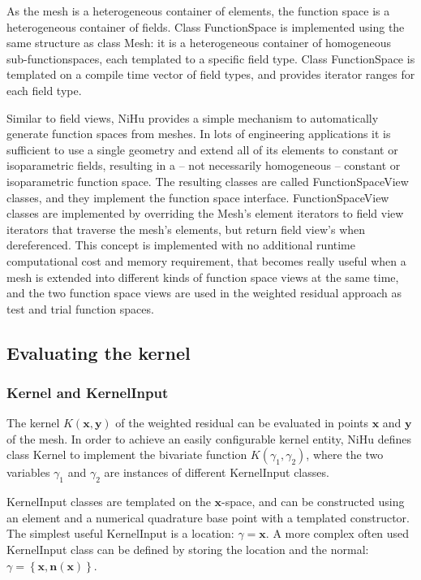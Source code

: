 \documentclass[review]{elsarticle}
\begin{document}
As the mesh is a heterogeneous container of elements, the function space is a heterogeneous container of fields.
Class FunctionSpace is implemented using the same structure as class Mesh: it is a heterogeneous container of homogeneous sub-functionspaces, each templated to a specific field type.
Class FunctionSpace is templated on a compile time vector of field types, and provides iterator ranges for each field type.

Similar to field views, NiHu provides a simple mechanism to automatically generate function spaces from meshes.
In lots of engineering applications it is sufficient to use a single geometry and extend all of its elements to constant or isoparametric fields, resulting in a -- not necessarily homogeneous -- constant or isoparametric function space.
The resulting classes are called FunctionSpaceView classes, and they implement the function space interface.
FunctionSpaceView classes are implemented by overriding the Mesh's element iterators to field view iterators that traverse the mesh's elements, but return field view's when dereferenced.
This concept is implemented with no additional runtime computational cost and memory requirement, that becomes really useful when a mesh is extended into different kinds of function space views at the same time, and the two function space views are used in the weighted residual approach as test and trial function spaces.


\subsection{Evaluating the kernel}


\subsubsection{Kernel and KernelInput}

The kernel $K(\bm{x},\bm{y})$ of the weighted residual can be evaluated in points $\bm{x}$ and $\bm{y}$ of the mesh.
In order to achieve an easily configurable kernel entity, NiHu defines class Kernel to implement the bivariate function $K(\gamma_1, \gamma_2)$, where the two variables $\gamma_1$ and $\gamma_2$ are instances of different KernelInput classes.

KernelInput classes are templated on the $\bm{x}$-space, and can be constructed using an element and a numerical quadrature base point with a templated constructor.
The simplest useful KernelInput is a location: $\gamma = \bm{x}$. A more complex often used KernelInput class can be defined by storing the location and the normal: $\gamma = \left\{\bm{x}, \bm{n}(\bm{x}) \right\}$.
\end{document}
